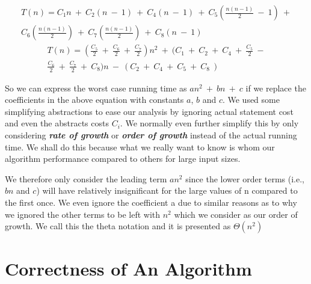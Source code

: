 \documentclass[12pt,a4paper]{book}
\begin{document}
\begin{equation}
\begin{aligned}
T(n) = C_{1}n\  +\  C_{2}(n\ -\ 1)\ +\ C_{4}(n\ -\ 1)\  +\ C_{5}(\frac{n(n-1)}{2}\ -\ 1)\ +\\
C_{6}(\frac{n(n-1)}{2})\ +\ C_{7}(\frac{n(n-1)}{2})\ +\ C_{8}(n\ -\ 1)
\end{aligned}
\end{equation}
\begin{equation}
\begin{aligned}
T(n) = (\frac{C_{5}}{2}\  +\  \frac{C_{6}}{2}\ +\ \frac{C_{7}}{2})n^2\ +\ (C_{1}\ +\ C_{2}\
 +\ C_{4}\ +\ \frac{C_{5}}{2}\ -\\
  \frac{C_{6}}{2}\ +\ \frac{C_{7}}{2}\ +\ C_{8})n\ -\ (C_{2}\ +\ C_{4}\ +\ C_{5}\ +\ C_{8}\ ) 
\end{aligned}
\end{equation}
\par So we can express the worst case running time as $an^2\ +\ bn\ +\ c$ if we replace the coefficients in the above equation with constants $a$, $b$ and $c$. We used some simplifying abstractions to ease our analysis by ignoring actual statement cost and even the abstracts costs $C_{i}$. We normally even further simplify this by only considering \textbf{\textit{rate of growth}} or \textbf{\textit{order of growth}} instead of the actual running time. We shall do this because what we really want to know is whom our algorithm performance compared to others for large input sizes.
\par We therefore only consider the leading term $an^2$ since the lower order terms (i.e., $bn$ and $c$) will have relatively insignificant for the large values of n compared to the first once. We even ignore the coefficient a due to similar reasons as to why we ignored the other terms to be left with $n^2$ which we consider as our order of growth. We call this the theta notation and it is presented as $\Theta(n^2)$
\section{Correctness of An Algorithm}
\end{document}
